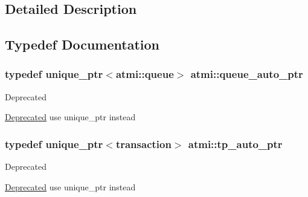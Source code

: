 \subsection{Detailed Description}


\subsection{Typedef Documentation}
\hypertarget{group___application-to-_transaction_ga9eff55eddc901da817f1b087613b18cc}{
\subsubsection[{queue\+\_\+auto\+\_\+ptr}]{\setlength{\rightskip}{0pt plus 5cm}typedef unique\+\_\+ptr$<${\bf atmi\+::queue}$>$ {\bf atmi\+::queue\+\_\+auto\+\_\+ptr}}}\label{group___application-to-_transaction_ga9eff55eddc901da817f1b087613b18cc}
\begin{DoxyRefDesc}{Deprecated}
\item[\hyperlink{deprecated__deprecated000003}{Deprecated}]use unique\+\_\+ptr instead \end{DoxyRefDesc}
\hypertarget{group___application-to-_transaction_ga4a71d76e59908eb5ec5e53269c2742b5}{
\subsubsection[{tp\+\_\+auto\+\_\+ptr}]{\setlength{\rightskip}{0pt plus 5cm}typedef unique\+\_\+ptr$<$transaction$>$ {\bf atmi\+::tp\+\_\+auto\+\_\+ptr}}}\label{group___application-to-_transaction_ga4a71d76e59908eb5ec5e53269c2742b5}
\begin{DoxyRefDesc}{Deprecated}
\item[\hyperlink{deprecated__deprecated000002}{Deprecated}]use unique\+\_\+ptr instead \end{DoxyRefDesc}


